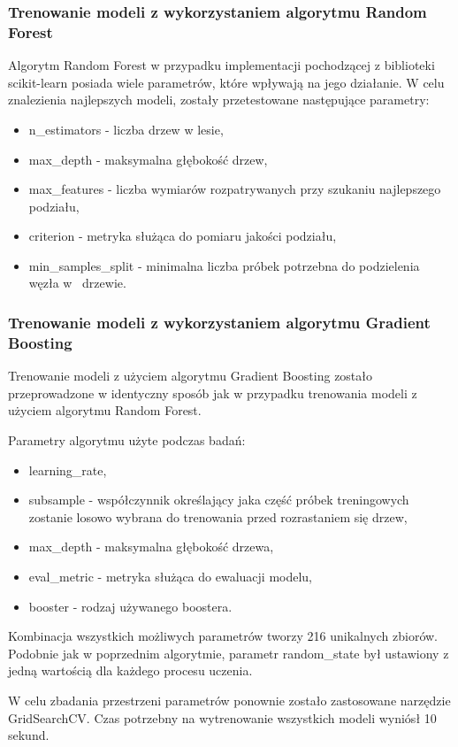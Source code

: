 \subsubsection{Trenowanie modeli z wykorzystaniem algorytmu Random Forest} \label{sec:rf-train}
Algorytm Random Forest w przypadku implementacji pochodzącej z biblioteki scikit-learn posiada wiele parametrów, które wpływają na jego działanie. W celu znalezienia najlepszych modeli, zostały przetestowane następujące parametry:
\begin{itemize}
    \item n\_estimators - liczba drzew w lesie,
    \item max\_depth - maksymalna głębokość drzew,
    \item max\_features - liczba wymiarów rozpatrywanych przy szukaniu najlepszego podziału,
    \item criterion - metryka służąca do pomiaru jakości podziału,
    \item min\_samples\_split - minimalna liczba próbek potrzebna do podzielenia węzła w~ drzewie.
\end{itemize}
\subsubsection{Trenowanie modeli z wykorzystaniem algorytmu Gradient Boosting}\label{sec:gb-train}
Trenowanie modeli z użyciem algorytmu Gradient Boosting zostało przeprowadzone w identyczny sposób jak w przypadku trenowania modeli z użyciem algorytmu Random Forest.

Parametry algorytmu użyte podczas badań:
\begin{itemize}
    \item learning\_rate,
    \item subsample - współczynnik określający jaka część próbek treningowych zostanie losowo wybrana do trenowania przed rozrastaniem się drzew,
    \item max\_depth - maksymalna głębokość drzewa,
    \item eval\_metric - metryka służąca do ewaluacji modelu,
    \item booster - rodzaj używanego boostera.
\end{itemize}

Kombinacja wszystkich możliwych parametrów tworzy 216 unikalnych zbiorów. Podobnie jak w poprzednim algorytmie, parametr random\_state był ustawiony z jedną wartością dla każdego procesu uczenia.

W celu zbadania przestrzeni parametrów ponownie zostało zastosowane narzędzie GridSearchCV. Czas potrzebny na wytrenowanie wszystkich modeli wyniósł 10 sekund.

